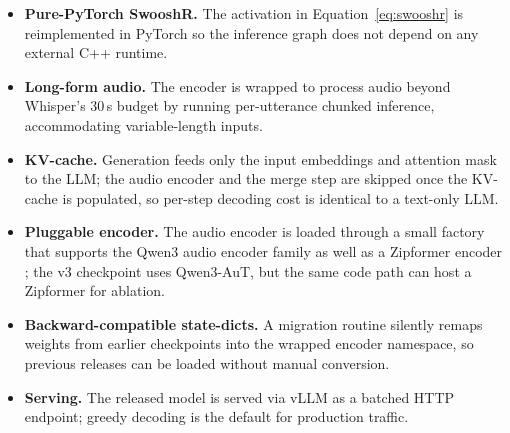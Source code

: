 \begin{itemize}
  \item \textbf{Pure-PyTorch SwooshR.} The activation in
        Equation~\ref{eq:swooshr} is reimplemented in PyTorch so the
        inference graph does not depend on any external C++ runtime.
  \item \textbf{Long-form audio.} The encoder is wrapped to process
        audio beyond Whisper's 30\,s budget by running per-utterance
        chunked inference, accommodating variable-length inputs.
  \item \textbf{KV-cache.} Generation feeds only the input embeddings
        and attention mask to the LLM; the audio encoder and the
        merge step are skipped once the KV-cache is populated, so
        per-step decoding cost is identical to a text-only LLM.
  \item \textbf{Pluggable encoder.} The audio encoder is loaded
        through a small factory that supports the Qwen3 audio
        encoder family as well as a Zipformer encoder
        \cite{yao2024zipformer}; the v3 checkpoint uses Qwen3-AuT,
        but the same code path can host a Zipformer for ablation.
  \item \textbf{Backward-compatible state-dicts.} A migration
        routine silently remaps weights from earlier checkpoints into
        the wrapped encoder namespace, so previous releases can be
        loaded without manual conversion.
  \item \textbf{Serving.} The released model is served via vLLM
        \cite{kwon2023vllm} as a batched HTTP endpoint; greedy
        decoding is the default for production traffic.
\end{itemize}

